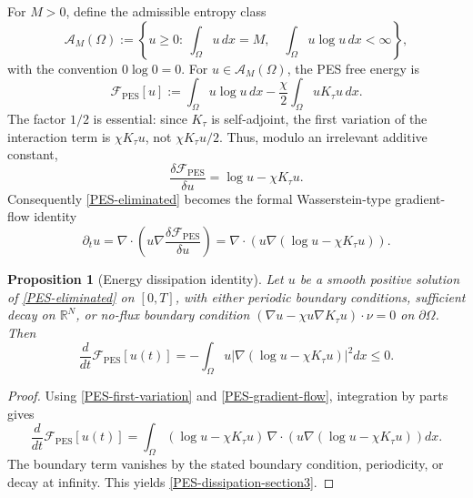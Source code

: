\documentclass[pdflatex,sn-mathphys-num]{sn-jnl}%
\theoremstyle{thmstyleone}
\newtheorem{proposition}[theorem]{Proposition}%
\theoremstyle{thmstyletwo}
\theoremstyle{thmstylethree}
\begin{document}
For \(M>0\), define the admissible entropy class
\begin{equation}
        \mathcal A_M(\Omega)
        :=
        \left\{
        u\ge0:\ \int_\Omega u\,dx=M,\quad
        \int_\Omega u\log u\,dx<\infty
        \right\},
\label{admissible-class}
\end{equation}
with the convention \(0\log0=0\).  For \(u\in\mathcal A_M(\Omega)\), the PES
free energy is
\begin{equation}
        \mathcal F_{\mathrm{PES}}[u]
        :=
        \int_\Omega u\log u\,dx
        -
        \frac{\chi}{2}\int_\Omega uK_\tau u\,dx.
\label{PES-free-energy-section3}
\end{equation}
The factor \(1/2\) is essential: since \(K_\tau\) is self-adjoint, the first
variation of the interaction term is \(\chi K_\tau u\), not
\(\chi K_\tau u/2\).  Thus, modulo an irrelevant additive constant,
\begin{equation}
        \frac{\delta\mathcal F_{\mathrm{PES}}}{\delta u}
        =
        \log u-\chi K_\tau u.
\label{PES-first-variation}
\end{equation}
Consequently \eqref{PES-eliminated} becomes the formal Wasserstein-type
gradient-flow identity
\begin{equation}
        \partial_tu
        =
        \nabla\cdot\left(
        u\nabla\frac{\delta\mathcal F_{\mathrm{PES}}}{\delta u}
        \right)
        =
        \nabla\cdot\left(u\nabla(\log u-\chi K_\tau u)\right).
\label{PES-gradient-flow}
\end{equation}

\begin{proposition}[Energy dissipation identity]
\label{prop:PES-energy-dissipation}
Let \(u\) be a smooth positive solution of \eqref{PES-eliminated} on
\([0,T]\), with either periodic boundary conditions, sufficient decay on
\(\mathbb R^N\), or no-flux boundary condition
\((\nabla u-\chi u\nabla K_\tau u)\cdot\nu=0\) on \(\partial\Omega\).  Then
\begin{equation}
        \frac{d}{dt}\mathcal F_{\mathrm{PES}}[u(t)]
        =
        -
        \int_\Omega
        u\left|\nabla(\log u-\chi K_\tau u)\right|^2dx
        \le0.
\label{PES-dissipation-section3}
\end{equation}
\end{proposition}

\begin{proof}
Using \eqref{PES-first-variation} and \eqref{PES-gradient-flow}, integration
by parts gives
\[
        \frac{d}{dt}\mathcal F_{\mathrm{PES}}[u(t)]
        =
        \int_\Omega
        (\log u-\chi K_\tau u)\,
        \nabla\cdot\left(u\nabla(\log u-\chi K_\tau u)\right)dx.
\]
The boundary term vanishes by the stated boundary condition, periodicity, or
decay at infinity.  This yields \eqref{PES-dissipation-section3}.
\end{proof}
\end{document}
